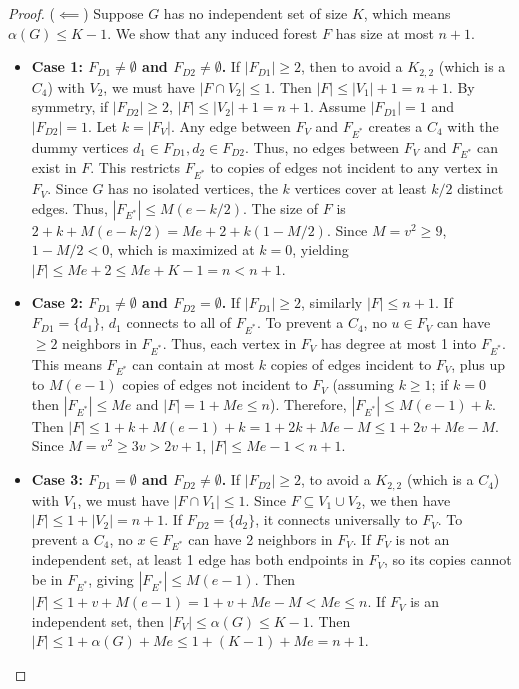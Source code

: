 \documentclass[a4paper]{amsart}
\begin{document}
\begin{proof}
    ($\impliedby$) Suppose $G$ has no independent set of size $K$, which means $\alpha(G) \le K-1$. We show that any induced forest $F$ has size at most $n+1$.
    \begin{itemize}
        \item \textbf{Case 1: $F_{D1} \neq \emptyset$ and $F_{D2} \neq \emptyset$.} If $|F_{D1}| \ge 2$, then to avoid a $K_{2,2}$ (which is a $C_4$) with $V_2$, we must have $|F \cap V_2| \le 1$. Then $|F| \le |V_1| + 1 = n+1$. By symmetry, if $|F_{D2}| \ge 2$, $|F| \le |V_2| + 1 = n+1$. Assume $|F_{D1}| = 1$ and $|F_{D2}| = 1$. Let $k = |F_V|$. Any edge between $F_V$ and $F_{E^*}$ creates a $C_4$ with the dummy vertices $d_1 \in F_{D1}, d_2 \in F_{D2}$. Thus, no edges between $F_V$ and $F_{E^*}$ can exist in $F$. This restricts $F_{E^*}$ to copies of edges not incident to any vertex in $F_V$. Since $G$ has no isolated vertices, the $k$ vertices cover at least $k/2$ distinct edges. Thus, $|F_{E^*}| \le M(e - k/2)$. The size of $F$ is $2 + k + M(e - k/2) = M e + 2 + k(1 - M/2)$. Since $M = v^2 \ge 9$, $1 - M/2 < 0$, which is maximized at $k=0$, yielding $|F| \le M e + 2 \le M e + K - 1 = n < n+1$.
        \item \textbf{Case 2: $F_{D1} \neq \emptyset$ and $F_{D2} = \emptyset$.} If $|F_{D1}| \ge 2$, similarly $|F| \le n+1$. If $F_{D1} = \{d_1\}$, $d_1$ connects to all of $F_{E^*}$. To prevent a $C_4$, no $u \in F_V$ can have $\ge 2$ neighbors in $F_{E^*}$. Thus, each vertex in $F_V$ has degree at most 1 into $F_{E^*}$. This means $F_{E^*}$ can contain at most $k$ copies of edges incident to $F_V$, plus up to $M(e-1)$ copies of edges not incident to $F_V$ (assuming $k \ge 1$; if $k=0$ then $|F_{E^*}| \le M e$ and $|F| = 1 + M e \le n$). Therefore, $|F_{E^*}| \le M(e-1) + k$. Then $|F| \le 1 + k + M(e-1) + k = 1 + 2k + M e - M \le 1 + 2v + M e - M$. Since $M = v^2 \ge 3v > 2v + 1$, $|F| \le M e - 1 < n+1$.
        \item \textbf{Case 3: $F_{D1} = \emptyset$ and $F_{D2} \neq \emptyset$.} If $|F_{D2}| \ge 2$, to avoid a $K_{2,2}$ (which is a $C_4$) with $V_1$, we must have $|F \cap V_1| \le 1$. Since $F \subseteq V_1 \cup V_2$, we then have $|F| \le 1 + |V_2| = n+1$. If $F_{D2} = \{d_2\}$, it connects universally to $F_V$. To prevent a $C_4$, no $x \in F_{E^*}$ can have 2 neighbors in $F_V$. If $F_V$ is not an independent set, at least 1 edge has both endpoints in $F_V$, so its copies cannot be in $F_{E^*}$, giving $|F_{E^*}| \le M(e-1)$. Then $|F| \le 1 + v + M(e-1) = 1 + v + M e - M < M e \le n$. If $F_V$ is an independent set, then $|F_V| \le \alpha(G) \le K-1$. Then $|F| \le 1 + \alpha(G) + M e \le 1 + (K-1) + M e = n+1$.

\end{itemize}
\end{proof}
\end{document}
